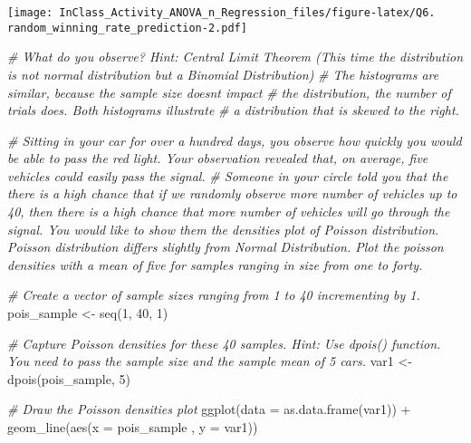 \documentclass[
]{article}
\newenvironment{Shaded}{\begin{snugshade}}{\end{snugshade}}
\newcommand{\AttributeTok}[1]{\textcolor[rgb]{0.77,0.63,0.00}{#1}}
\newcommand{\CommentTok}[1]{\textcolor[rgb]{0.56,0.35,0.01}{\textit{#1}}}
\newcommand{\DecValTok}[1]{\textcolor[rgb]{0.00,0.00,0.81}{#1}}
\newcommand{\FunctionTok}[1]{\textcolor[rgb]{0.00,0.00,0.00}{#1}}
\newcommand{\NormalTok}[1]{#1}
\newcommand{\OtherTok}[1]{\textcolor[rgb]{0.56,0.35,0.01}{#1}}
\newcommand{\SpecialCharTok}[1]{\textcolor[rgb]{0.00,0.00,0.00}{#1}}
\begin{document}
\texttt{[image: InClass\_Activity\_ANOVA\_n\_Regression\_files/figure-latex/Q6. random\_winning\_rate\_prediction-2.pdf]}

\begin{Shaded}
\begin{Highlighting}[]
\CommentTok{\# What do you observe? Hint: Central Limit Theorem (This time the distribution is not normal distribution but a Binomial Distribution)}
\CommentTok{\#\textquotesingle{} The histograms are similar, because the sample size doesn\textquotesingle{}t impact}
\CommentTok{\#\textquotesingle{} the distribution, the number of trials does. Both histograms illustrate }
\CommentTok{\#\textquotesingle{} a distribution that is skewed to the right.}
\end{Highlighting}
\end{Shaded}

\begin{Shaded}
\begin{Highlighting}[]
\CommentTok{\# Sitting in your car for over a hundred days, you observe how quickly you would be able to pass the red light. Your observation revealed that, on average, five vehicles could easily pass the signal. }
\CommentTok{\# Someone in your circle told you that the there is a high chance that if we randomly observe more number of vehicles up to 40, then there is a high chance that more number of vehicles will go through the signal. You would like to show them the densities plot of Poisson distribution. Poisson distribution differs slightly from Normal Distribution. Plot the poisson densities with a mean of five for samples ranging in size from one to forty.}

\CommentTok{\# Create a vector of sample sizes ranging from 1 to 40 incrementing by 1. }
\NormalTok{pois\_sample }\OtherTok{\textless{}{-}} \FunctionTok{seq}\NormalTok{(}\DecValTok{1}\NormalTok{, }\DecValTok{40}\NormalTok{, }\DecValTok{1}\NormalTok{)}

\CommentTok{\# Capture Poisson densities for these 40 samples. Hint: Use dpois() function. You need to pass the sample size and the sample mean of 5 cars. }
\NormalTok{var1 }\OtherTok{\textless{}{-}} \FunctionTok{dpois}\NormalTok{(pois\_sample, }\DecValTok{5}\NormalTok{)}

\CommentTok{\# Draw the Poisson densities plot}
\FunctionTok{ggplot}\NormalTok{(}\AttributeTok{data =} \FunctionTok{as.data.frame}\NormalTok{(var1)) }\SpecialCharTok{+}
  \FunctionTok{geom\_line}\NormalTok{(}\FunctionTok{aes}\NormalTok{(}\AttributeTok{x =}\NormalTok{ pois\_sample , }\AttributeTok{y =}\NormalTok{ var1))}
\end{Highlighting}
\end{Shaded}
\end{document}
